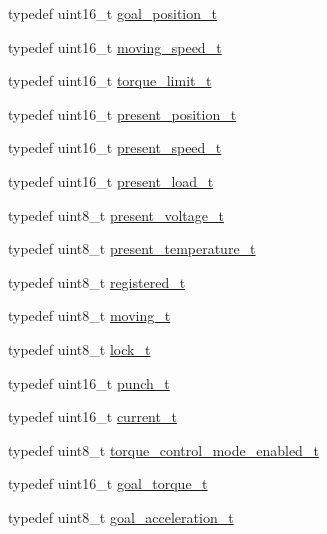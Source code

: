 \begin{DoxyCompactItemize}
\item 
typedef uint16\+\_\+t \hyperlink{structdynamixel_1_1servos_1_1_model_traits_3_01_mx64_01_4_1_1_c_t_a21d55551fadcf5002adf85d7d7c8473a}{goal\+\_\+position\+\_\+t}
\item 
typedef uint16\+\_\+t \hyperlink{structdynamixel_1_1servos_1_1_model_traits_3_01_mx64_01_4_1_1_c_t_a12fe88ff80aa5a2d916bd9a1c4191c31}{moving\+\_\+speed\+\_\+t}
\item 
typedef uint16\+\_\+t \hyperlink{structdynamixel_1_1servos_1_1_model_traits_3_01_mx64_01_4_1_1_c_t_a9b62cad9a1adfeb232ca8bf887f1be89}{torque\+\_\+limit\+\_\+t}
\item 
typedef uint16\+\_\+t \hyperlink{structdynamixel_1_1servos_1_1_model_traits_3_01_mx64_01_4_1_1_c_t_af854f40fed502d736356103ad3513bb1}{present\+\_\+position\+\_\+t}
\item 
typedef uint16\+\_\+t \hyperlink{structdynamixel_1_1servos_1_1_model_traits_3_01_mx64_01_4_1_1_c_t_a0a0adb4e69ec9794ce87f1b987376beb}{present\+\_\+speed\+\_\+t}
\item 
typedef uint16\+\_\+t \hyperlink{structdynamixel_1_1servos_1_1_model_traits_3_01_mx64_01_4_1_1_c_t_a746e8e37b3331fdb9bd345e3eb897a81}{present\+\_\+load\+\_\+t}
\item 
typedef uint8\+\_\+t \hyperlink{structdynamixel_1_1servos_1_1_model_traits_3_01_mx64_01_4_1_1_c_t_a6e472527310dc96113bef8cc5c75aa28}{present\+\_\+voltage\+\_\+t}
\item 
typedef uint8\+\_\+t \hyperlink{structdynamixel_1_1servos_1_1_model_traits_3_01_mx64_01_4_1_1_c_t_acf2397326a1797ab7832e612df56991a}{present\+\_\+temperature\+\_\+t}
\item 
typedef uint8\+\_\+t \hyperlink{structdynamixel_1_1servos_1_1_model_traits_3_01_mx64_01_4_1_1_c_t_a0490c083df44633c1b8c48c1a908c276}{registered\+\_\+t}
\item 
typedef uint8\+\_\+t \hyperlink{structdynamixel_1_1servos_1_1_model_traits_3_01_mx64_01_4_1_1_c_t_a1d55f58c72a46db086739296dff83321}{moving\+\_\+t}
\item 
typedef uint8\+\_\+t \hyperlink{structdynamixel_1_1servos_1_1_model_traits_3_01_mx64_01_4_1_1_c_t_a456110dac66e6fcd5628c0b2da3bdfbe}{lock\+\_\+t}
\item 
typedef uint16\+\_\+t \hyperlink{structdynamixel_1_1servos_1_1_model_traits_3_01_mx64_01_4_1_1_c_t_add89f9b11159bee3a3fede76be572c09}{punch\+\_\+t}
\item 
typedef uint16\+\_\+t \hyperlink{structdynamixel_1_1servos_1_1_model_traits_3_01_mx64_01_4_1_1_c_t_aaebe995d226d68483862835a5ab799d9}{current\+\_\+t}
\item 
typedef uint8\+\_\+t \hyperlink{structdynamixel_1_1servos_1_1_model_traits_3_01_mx64_01_4_1_1_c_t_a7876ad8fcc6d1a01656fe64e2a41e039}{torque\+\_\+control\+\_\+mode\+\_\+enabled\+\_\+t}
\item 
typedef uint16\+\_\+t \hyperlink{structdynamixel_1_1servos_1_1_model_traits_3_01_mx64_01_4_1_1_c_t_a81c94909d1ff43ddb536dc15984a1393}{goal\+\_\+torque\+\_\+t}
\item 
typedef uint8\+\_\+t \hyperlink{structdynamixel_1_1servos_1_1_model_traits_3_01_mx64_01_4_1_1_c_t_a418d58ba2ceb9c51312ed714ea8aced8}{goal\+\_\+acceleration\+\_\+t}
\end{DoxyCompactItemize}
